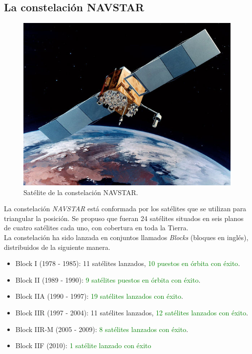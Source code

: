 \subsection{La constelación NAVSTAR}

\begin{figure}[ht]
\centering
\includegraphics[scale=0.29]{Figures/Navstar}
\caption[Satélite de la constelación NAVSTAR.]{Satélite de la constelación NAVSTAR.}
\label{fig:NAV}
\end{figure}

La constelación \textit{NAVSTAR} está conformada por los satélites que se utilizan para triangular la posición. Se propuso que fueran 24 satélites situados en seis planos de cuatro satélites cada uno, con cobertura en toda la Tierra. \\

La constelación ha sido lanzada en conjuntos llamados \textit{Blocks} (bloques en inglés), distribuidos de la siguiente manera.

\begin{itemize}
	\item Block I (1978 - 1985): 11 satélites lanzados, \textcolor{green}{10 puestos en órbita con éxito}.
	\item Block II (1989 - 1990): \textcolor{green}{9 satélites puestos en órbita con éxito}.
	\item Block IIA (1990 - 1997): \textcolor{green}{19 satélites lanzados con éxito}.
	\item Block IIR (1997 - 2004): 11 satélites lanzados, \textcolor{green}{12 satélites lanzados con éxito}.
	\item Block IIR-M (2005 - 2009): \textcolor{green}{8 satélites lanzados con éxito}.
	\item Block IIF (2010): \textcolor{green}{1 satélite lanzado con éxito} \citep{termal2014prototipo}
\end{itemize}

